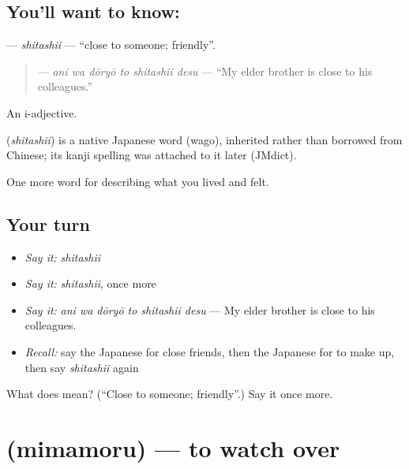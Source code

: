 \subsection*{You'll want to know: }
\textbf{} — \emph{shitashii} — \textquotedblleft{}close to someone; friendly\textquotedblright{}.

\begin{quote}
\textbf{  } — \emph{ani wa dōryō to shitashii desu} — \textquotedblleft{}My elder brother is close to his colleagues.\textquotedblright{}
\end{quote}

An i-adjective.

\begin{cousinweb}
\textbf{} (\emph{shitashii}) is a native Japanese word (wago), inherited rather than borrowed from Chinese; its kanji spelling was attached to it later (JMdict).
\end{cousinweb}

\begin{grammarlens}[title={What you've built}]
One more word for describing what you lived and felt.
\end{grammarlens}

\subsection*{Your turn}
\begin{itemize}
\raggedright
  \item \emph{Say it:} \emph{shitashii}
  \item \emph{Say it:} \emph{shitashii}, once more
  \item \emph{Say it:} \emph{ani wa dōryō to shitashii desu} — My elder brother is close to his colleagues.
  \item \emph{Recall:} say the Japanese for close friends, then the Japanese for to make up, then say \emph{shitashii} again
\end{itemize}

\begin{tcolorbox}[breakable,colback=teal!4,colframe=teal!35!black,title={Before you move on}]
What does  mean? (\textquotedblleft{}Close to someone; friendly\textquotedblright{}.) Say it once more.
\end{tcolorbox}
\section[\texorpdfstring{\ja{みまもる} (mimamoru)}{みまもる (mimamoru)}]{ (mimamoru) — to watch over}

